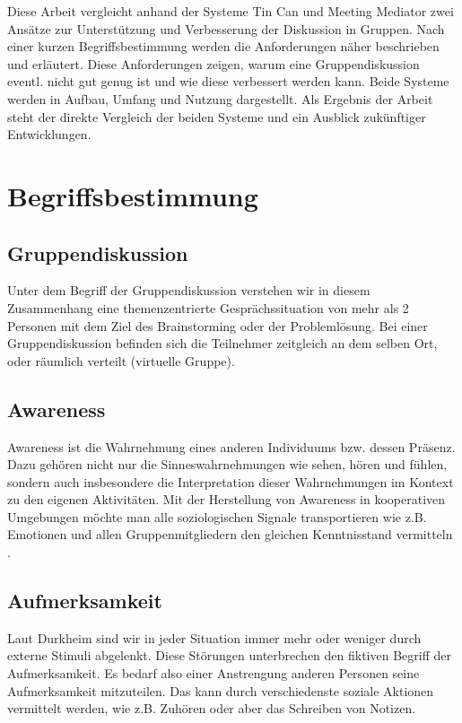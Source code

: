 \documentclass{seminarvorlage}
\begin{document}
Diese Arbeit vergleicht anhand der Systeme Tin Can \cite{HarGorSch2012} und
Meeting Mediator \cite{KimChaHolPent2008} zwei Ansätze zur Unterstützung und
Verbesserung der Diskussion in Gruppen.
Nach einer kurzen Begriffsbestimmung werden die Anforderungen näher beschrieben
und erläutert. Diese Anforderungen zeigen, warum eine Gruppendiskussion eventl.
nicht gut genug ist und wie diese verbessert werden kann. Beide Systeme werden
in Aufbau, Umfang und Nutzung dargestellt. Als Ergebnis der Arbeit steht der
direkte Vergleich der beiden Systeme und ein Ausblick zu\-künf\-ti\-ger
Entwicklungen.


\section{Begriffsbestimmung}
\subsection{Gruppendiskussion}
Unter dem Begriff der Gruppendiskussion verstehen wir in diesem Zusammenhang
eine themenzentrierte Ge\-sprächs\-situa\-tion von mehr als 2 Personen mit dem
Ziel des Brainstorming oder der Problemlösung. Bei einer Gruppendiskussion befinden
sich die Teilnehmer zeitgleich an dem selben Ort, oder räumlich verteilt
(virtuelle Gruppe).

\subsection{Awareness}
Awareness ist die Wahrnehmung eines anderen Individuums bzw. dessen Präsenz.
Dazu gehören nicht nur die Sinneswahrnehmungen wie sehen, hören und fühlen,
sondern auch insbesondere die Interpretation dieser Wahrnehmungen im Kontext zu
den eigenen Aktivitäten.
Mit der Herstellung von Awareness in kooperativen Umgebungen mö\-chte man alle
soziologischen Signale transportieren wie z.B. Emotionen und allen
Gruppenmitgliedern den gleichen Kenntnisstand vermitteln \cite{SchuLuk2007}.

\subsection{Aufmerksamkeit}
Laut Durkheim \cite{Dur1974} sind wir in jeder Situation immer mehr oder weniger
durch externe Stimuli abgelenkt. Diese Stör\-un\-gen unterbrechen den fiktiven
Begriff der Aufmerksamkeit. Es bedarf also einer Anstrengung anderen Personen
seine Aufmerksamkeit mitzuteilen. Das kann durch verschiedenste soziale Aktionen
vermittelt werden, wie z.B. Zuhören oder aber das Schreiben von Notizen.
\end{document}
